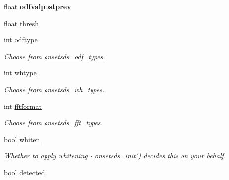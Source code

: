 \begin{DoxyCompactItemize}
\item 
\hypertarget{structOnsetsDS_a25445d9e1285153b591327cfa6abc3ad}{float {\bfseries odfvalpostprev}}\label{structOnsetsDS_a25445d9e1285153b591327cfa6abc3ad}

\item 
float \hyperlink{structOnsetsDS_a9303e0d0a909db24d327259ec4317e98}{thresh}
\item 
\hypertarget{structOnsetsDS_afd206f369df402dbb4cee05a30dc3ef5}{int \hyperlink{structOnsetsDS_afd206f369df402dbb4cee05a30dc3ef5}{odftype}}\label{structOnsetsDS_afd206f369df402dbb4cee05a30dc3ef5}

\begin{DoxyCompactList}\small\item\em \-Choose from \hyperlink{onsetsds_8h_a09065a442711dbed773c9cfdd7140103}{onsetsds\-\_\-odf\-\_\-types}. \end{DoxyCompactList}\item 
\hypertarget{structOnsetsDS_a4d9a9f9c1bd06f39ed30d92b114b3c9d}{int \hyperlink{structOnsetsDS_a4d9a9f9c1bd06f39ed30d92b114b3c9d}{whtype}}\label{structOnsetsDS_a4d9a9f9c1bd06f39ed30d92b114b3c9d}

\begin{DoxyCompactList}\small\item\em \-Choose from \hyperlink{onsetsds_8h_a0182d79ce07ff3441deb537e20ed2f5e}{onsetsds\-\_\-wh\-\_\-types}. \end{DoxyCompactList}\item 
\hypertarget{structOnsetsDS_a6af1a5dc0c576eae89ff5686d5164a5c}{int \hyperlink{structOnsetsDS_a6af1a5dc0c576eae89ff5686d5164a5c}{fftformat}}\label{structOnsetsDS_a6af1a5dc0c576eae89ff5686d5164a5c}

\begin{DoxyCompactList}\small\item\em \-Choose from \hyperlink{onsetsds_8h_aac4a978d7a67d6e681d666b4c2c10ff6}{onsetsds\-\_\-fft\-\_\-types}. \end{DoxyCompactList}\item 
\hypertarget{structOnsetsDS_a3e865aeaa9a1e056fab65a1db9619f9d}{bool \hyperlink{structOnsetsDS_a3e865aeaa9a1e056fab65a1db9619f9d}{whiten}}\label{structOnsetsDS_a3e865aeaa9a1e056fab65a1db9619f9d}

\begin{DoxyCompactList}\small\item\em \-Whether to apply whitening -\/ \hyperlink{group__MainUserFuncs_gab23ae57d91a4ea14c4603243c84a7ed6}{onsetsds\-\_\-init()} decides this on your behalf. \end{DoxyCompactList}\item 
\hypertarget{structOnsetsDS_a6265c6e1d995aefc3e242bb717796c09}{bool \hyperlink{structOnsetsDS_a6265c6e1d995aefc3e242bb717796c09}{detected}}\label{structOnsetsDS_a6265c6e1d995aefc3e242bb717796c09}


\end{DoxyCompactItemize}
